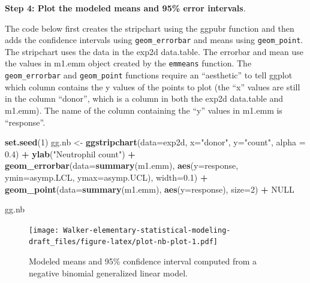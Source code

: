 \documentclass[]{book}
\newenvironment{Shaded}{\begin{snugshade}}{\end{snugshade}}
\newcommand{\DataTypeTok}[1]{\textcolor[rgb]{0.13,0.29,0.53}{#1}}
\newcommand{\DecValTok}[1]{\textcolor[rgb]{0.00,0.00,0.81}{#1}}
\newcommand{\FloatTok}[1]{\textcolor[rgb]{0.00,0.00,0.81}{#1}}
\newcommand{\KeywordTok}[1]{\textcolor[rgb]{0.13,0.29,0.53}{\textbf{#1}}}
\newcommand{\NormalTok}[1]{#1}
\newcommand{\OperatorTok}[1]{\textcolor[rgb]{0.81,0.36,0.00}{\textbf{#1}}}
\newcommand{\OtherTok}[1]{\textcolor[rgb]{0.56,0.35,0.01}{#1}}
\newcommand{\StringTok}[1]{\textcolor[rgb]{0.31,0.60,0.02}{#1}}
\begin{document}
\textbf{Step 4: Plot the modeled means and 95\% error intervals}.

The code below first creates the stripchart using the ggpubr function and then adds the confidence intervals using \texttt{geom\_errorbar} and means using \texttt{geom\_point}. The stripchart uses the data in the exp2d data.table. The errorbar and mean use the values in m1.emm object created by the \texttt{emmeans} function. The \texttt{geom\_errorbar} and \texttt{geom\_point} functions require an ``aesthetic'' to tell ggplot which column contains the y values of the points to plot (the ``x'' values are still in the column ``donor'', which is a column in both the exp2d data.table and m1.emm). The name of the column containing the ``y'' values in m1.emm is ``response''.

\begin{Shaded}
\begin{Highlighting}[]
\KeywordTok{set.seed}\NormalTok{(}\DecValTok{1}\NormalTok{)}
\NormalTok{gg.nb <-}\StringTok{ }\KeywordTok{ggstripchart}\NormalTok{(}\DataTypeTok{data=}\NormalTok{exp2d,}
                 \DataTypeTok{x=}\StringTok{"donor"}\NormalTok{, }
                 \DataTypeTok{y=}\StringTok{"count"}\NormalTok{,}
                 \DataTypeTok{alpha =} \FloatTok{0.4}\NormalTok{) }\OperatorTok{+}
\StringTok{  }\KeywordTok{ylab}\NormalTok{(}\StringTok{"Neutrophil count"}\NormalTok{) }\OperatorTok{+}
\StringTok{  }\KeywordTok{geom_errorbar}\NormalTok{(}\DataTypeTok{data=}\KeywordTok{summary}\NormalTok{(m1.emm), }
                \KeywordTok{aes}\NormalTok{(}\DataTypeTok{y=}\NormalTok{response,}
                    \DataTypeTok{ymin=}\NormalTok{asymp.LCL, }
                    \DataTypeTok{ymax=}\NormalTok{asymp.UCL), }
                \DataTypeTok{width=}\FloatTok{0.1}\NormalTok{) }\OperatorTok{+}
\StringTok{  }\KeywordTok{geom_point}\NormalTok{(}\DataTypeTok{data=}\KeywordTok{summary}\NormalTok{(m1.emm), }
                \KeywordTok{aes}\NormalTok{(}\DataTypeTok{y=}\NormalTok{response), }
                \DataTypeTok{size=}\DecValTok{2}\NormalTok{) }\OperatorTok{+}
\StringTok{  }\OtherTok{NULL}

\NormalTok{gg.nb}
\end{Highlighting}
\end{Shaded}

\begin{figure}
\centering
\texttt{[image: Walker-elementary-statistical-modeling-draft\_files/figure-latex/plot-nb-plot-1.pdf]}
\caption{\label{fig:plot-nb-plot}Modeled means and 95\% confidence interval computed from a negative binomial generalized linear model.}
\end{figure}
\end{document}
